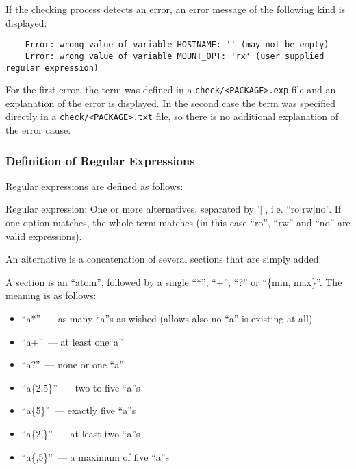 If the checking process detects an error, an error message of the following kind
is displayed:

\begin{example}
\begin{verbatim}
    Error: wrong value of variable HOSTNAME: '' (may not be empty)
    Error: wrong value of variable MOUNT_OPT: 'rx' (user supplied regular expression)
\end{verbatim}
\end{example}

For the first error, the term was defined in a \texttt{check/<PACKAGE>.exp} file and
an explanation of the error is displayed. In the second case the term was
specified directly in a \texttt{check/<PACKAGE>.txt} file, so there is no
additional explanation of the error cause.

\subsubsection{Definition of Regular Expressions}

Regular expressions are defined as follows:

Regular expression: One or more alternatives, separated by
'$|$', i.e. ``ro$|$rw$|$no''. If one option matches, the whole term
matches (in this case ``ro'', ``rw'' and ``no'' are valid expressions).

An alternative is a concatenation of several sections that are simply added.

A section is an ``atom'', followed by a single ``*'', ``+'',
``?'' or ``\{min, max\}''. The meaning is as follows:
\begin{itemize}
\item ``a*''~--- as many ``a''s as wished (allows also no ``a'' is existing at all)
\item   ``a+''~--- at least one``a''
\item   ``a?''~--- none or one ``a''
\item   ``a\{2,5\}''~--- two to five ``a''s
\item   ``a\{5\}''~--- exactly five ``a''s
\item   ``a\{2,\}''~--- at least two ``a''s
\item   ``a\{,5\}''~--- a maximum of five ``a''s
\end{itemize}


